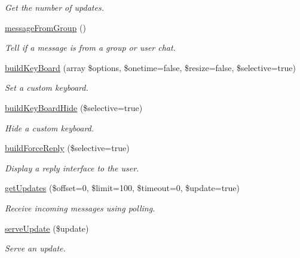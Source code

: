 \begin{DoxyCompactItemize}
\begin{DoxyCompactList}\small\item\em Get the number of updates. \end{DoxyCompactList}\item 
\hyperlink{class_telegram_a59b7bf91ea3b26d732f7536c2d65da19}{message\+From\+Group} ()
\begin{DoxyCompactList}\small\item\em Tell if a message is from a group or user chat. \end{DoxyCompactList}\item 
\hyperlink{class_telegram_a5c9619923ae1810aa340fa0e9acc1744}{build\+Key\+Board} (array \$options, \$onetime=false, \$resize=false, \$selective=true)
\begin{DoxyCompactList}\small\item\em Set a custom keyboard. \end{DoxyCompactList}\item 
\hyperlink{class_telegram_a3a02a8bbaf6021f98871752bfd32de97}{build\+Key\+Board\+Hide} (\$selective=true)
\begin{DoxyCompactList}\small\item\em Hide a custom keyboard. \end{DoxyCompactList}\item 
\hypertarget{class_telegram_a34cfc8575c348ca3dd168b9611af4f1c}{}\hyperlink{class_telegram_a34cfc8575c348ca3dd168b9611af4f1c}{build\+Force\+Reply} (\$selective=true)\label{class_telegram_a34cfc8575c348ca3dd168b9611af4f1c}

\begin{DoxyCompactList}\small\item\em Display a reply interface to the user. \end{DoxyCompactList}\item 
\hyperlink{class_telegram_adb467486d3d5e83ce21a03e00f17b16c}{get\+Updates} (\$offset=0, \$limit=100, \$timeout=0, \$update=true)
\begin{DoxyCompactList}\small\item\em Receive incoming messages using polling. \end{DoxyCompactList}\item 
\hyperlink{class_telegram_a57e6066940e4cca7310cfd5c45fd8510}{serve\+Update} (\$update)
\begin{DoxyCompactList}\small\item\em Serve an update. \end{DoxyCompactList}\end{DoxyCompactItemize}


